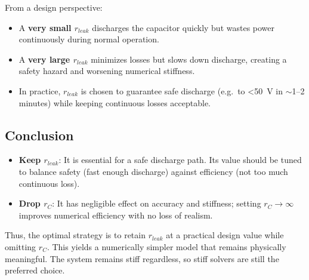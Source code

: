 From a design perspective:
\begin{itemize}
    \item A \textbf{very small $r_{leak}$} discharges the capacitor quickly but wastes power continuously during normal operation.  
    \item A \textbf{very large $r_{leak}$} minimizes losses but slows down discharge, creating a safety hazard and worsening numerical stiffness.  
    \item In practice, $r_{leak}$ is chosen to guarantee safe discharge (e.g.\ to <50~V in $\sim$1--2 minutes) while keeping continuous losses acceptable.
\end{itemize}

\subsection*{Conclusion}

\begin{itemize}
    \item \textbf{Keep $r_{leak}$}: It is essential for a safe discharge path. Its value should be tuned to balance safety (fast enough discharge) against efficiency (not too much continuous loss).
    \item \textbf{Drop $r_C$}: It has negligible effect on accuracy and stiffness; setting $r_C \to \infty$ improves numerical efficiency with no loss of realism.
\end{itemize}

Thus, the optimal strategy is to retain $r_{leak}$ at a practical design value while omitting $r_C$. This yields a numerically simpler model that remains physically meaningful. The system remains stiff regardless, so stiff solvers are still the preferred choice.

